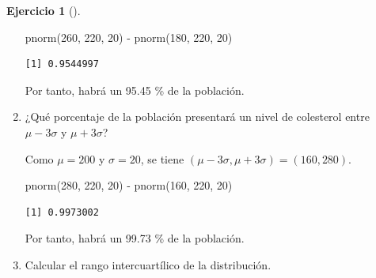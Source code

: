 \documentclass[
  a4paper,
]{scrreport}
\newenvironment{Shaded}{\begin{snugshade}}{\end{snugshade}}
\newcommand{\DecValTok}[1]{\textcolor[rgb]{0.68,0.00,0.00}{#1}}
\newcommand{\FunctionTok}[1]{\textcolor[rgb]{0.28,0.35,0.67}{#1}}
\newcommand{\NormalTok}[1]{\textcolor[rgb]{0.00,0.23,0.31}{#1}}
\newcommand{\SpecialCharTok}[1]{\textcolor[rgb]{0.37,0.37,0.37}{#1}}
\theoremstyle{definition}
\newtheorem{exercise}{Ejercicio}[chapter]
\theoremstyle{remark}
\begin{document}
\begin{exercise}[]
\begin{enumerate}
\begin{tcolorbox}
\begin{Shaded}
\begin{Highlighting}[]
\FunctionTok{pnorm}\NormalTok{(}\DecValTok{260}\NormalTok{, }\DecValTok{220}\NormalTok{, }\DecValTok{20}\NormalTok{) }\SpecialCharTok{{-}} \FunctionTok{pnorm}\NormalTok{(}\DecValTok{180}\NormalTok{, }\DecValTok{220}\NormalTok{, }\DecValTok{20}\NormalTok{)}
\end{Highlighting}
\end{Shaded}

\begin{verbatim}
[1] 0.9544997
\end{verbatim}

  Por tanto, habrá un 95.45 \% de la población.

  \end{tcolorbox}
\item
  ¿Qué porcentaje de la población presentará un nivel de colesterol
  entre \(\mu-3\sigma\) y \(\mu+3\sigma\)?

  \begin{tcolorbox}[enhanced jigsaw, breakable, toptitle=1mm, colbacktitle=quarto-callout-tip-color!10!white, rightrule=.15mm, opacityback=0, opacitybacktitle=0.6, titlerule=0mm, coltitle=black, colframe=quarto-callout-tip-color-frame, colback=white, bottomtitle=1mm, leftrule=.75mm, toprule=.15mm, title=\textcolor{quarto-callout-tip-color}{\faLightbulb}\hspace{0.5em}{Solución}, arc=.35mm, bottomrule=.15mm, left=2mm]

  Como \(\mu=200\) y \(\sigma=20\), se tiene
  \((\mu-3\sigma, \mu+3\sigma) = (160, 280)\).

\begin{Shaded}
\begin{Highlighting}[]
\FunctionTok{pnorm}\NormalTok{(}\DecValTok{280}\NormalTok{, }\DecValTok{220}\NormalTok{, }\DecValTok{20}\NormalTok{) }\SpecialCharTok{{-}} \FunctionTok{pnorm}\NormalTok{(}\DecValTok{160}\NormalTok{, }\DecValTok{220}\NormalTok{, }\DecValTok{20}\NormalTok{)}
\end{Highlighting}
\end{Shaded}

\begin{verbatim}
[1] 0.9973002
\end{verbatim}

  Por tanto, habrá un 99.73 \% de la población.

  \end{tcolorbox}
\item
  Calcular el rango intercuartílico de la distribución.


\end{enumerate}
\end{exercise}
\end{document}
